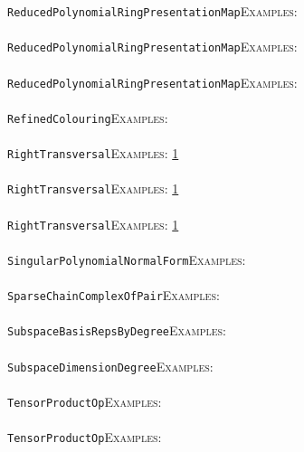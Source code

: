 \documentclass[a4paper,11pt]{report}
\begin{document}
{{ \texttt{ReducedPolynomialRingPresentationMap}{\nobreakspace}{\nobreakspace}{\nobreakspace}{\nobreakspace}\textsc{Examples:} \\
 \\
 \texttt{ReducedPolynomialRingPresentationMap}{\nobreakspace}{\nobreakspace}{\nobreakspace}{\nobreakspace}\textsc{Examples:} \\
 \\
 \texttt{ReducedPolynomialRingPresentationMap}{\nobreakspace}{\nobreakspace}{\nobreakspace}{\nobreakspace}\textsc{Examples:} \\
 \\
 \texttt{RefinedColouring}{\nobreakspace}{\nobreakspace}{\nobreakspace}{\nobreakspace}\textsc{Examples:} \\
 \\
 \texttt{RightTransversal}{\nobreakspace}{\nobreakspace}{\nobreakspace}{\nobreakspace}\textsc{Examples:} \href{tutorial/chap10.html} {1}{\nobreakspace} \\
 \\
 \texttt{RightTransversal}{\nobreakspace}{\nobreakspace}{\nobreakspace}{\nobreakspace}\textsc{Examples:} \href{tutorial/chap10.html} {1}{\nobreakspace} \\
 \\
 \texttt{RightTransversal}{\nobreakspace}{\nobreakspace}{\nobreakspace}{\nobreakspace}\textsc{Examples:} \href{tutorial/chap10.html} {1}{\nobreakspace} \\
 \\
 \texttt{SingularPolynomialNormalForm}{\nobreakspace}{\nobreakspace}{\nobreakspace}{\nobreakspace}\textsc{Examples:} \\
 \\
 \texttt{SparseChainComplexOfPair}{\nobreakspace}{\nobreakspace}{\nobreakspace}{\nobreakspace}\textsc{Examples:} \\
 \\
 \texttt{SubspaceBasisRepsByDegree}{\nobreakspace}{\nobreakspace}{\nobreakspace}{\nobreakspace}\textsc{Examples:} \\
 \\
 \texttt{SubspaceDimensionDegree}{\nobreakspace}{\nobreakspace}{\nobreakspace}{\nobreakspace}\textsc{Examples:} \\
 \\
 \texttt{TensorProductOp}{\nobreakspace}{\nobreakspace}{\nobreakspace}{\nobreakspace}\textsc{Examples:} \\
 \\
 \texttt{TensorProductOp}{\nobreakspace}{\nobreakspace}{\nobreakspace}{\nobreakspace}\textsc{Examples:} \\
}}
\end{document}
